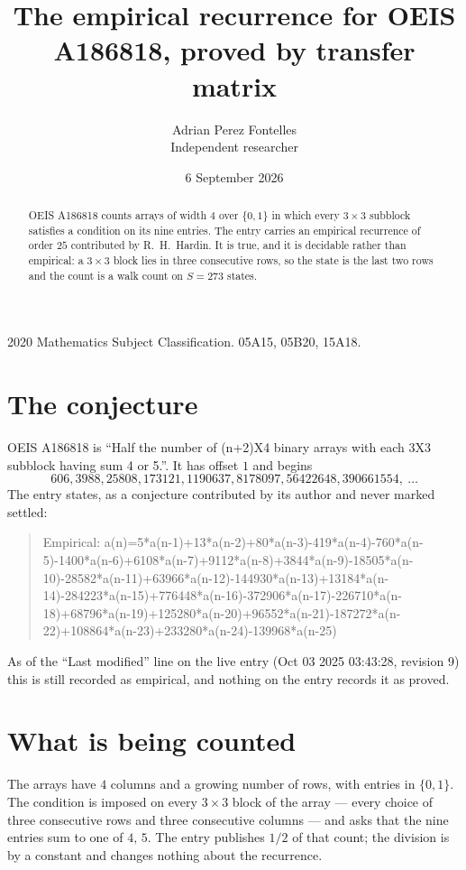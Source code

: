 \documentclass[11pt,a4paper]{article}
\title{The empirical recurrence for OEIS A186818, proved by transfer matrix}
\author{Adrian Perez Fontelles\\ \small Independent researcher}
\date{6 September 2026}
\theoremstyle{plain}
\theoremstyle{definition}
\begin{document}
\maketitle

\begin{abstract}
OEIS A186818 counts arrays of width $4$ over $\{0,1\}$ in which every $3\times3$ subblock
satisfies a condition on its nine entries. The entry carries an empirical recurrence of order
$25$ contributed by R.~H.~Hardin. It is true, and it is decidable rather than empirical: a
$3\times3$ block lies in three consecutive rows, so the state is the last two rows and the
count is a walk count on $S=273$ states.
\end{abstract}

\noindent\small 2020 Mathematics Subject Classification. 05A15, 05B20, 15A18.\normalsize

\section{The conjecture}

OEIS A186818 is ``Half the number of (n+2)X4 binary arrays with each 3X3 subblock having sum 4 or 5.''. It has offset $1$ and begins
\[
606, 3988, 25808, 173121, 1190637, 8178097, 56422648, 390661554,\ \dots
\]
The entry states, as a conjecture contributed by its author and never marked settled:
\begin{quote}
Empirical: a(n)=5*a(n-1)+13*a(n-2)+80*a(n-3)-419*a(n-4)-760*a(n-5)-1400*a(n-6)+6108*a(n-7)+9112*a(n-8)+3844*a(n-9)-18505*a(n-10)-28582*a(n-11)+63966*a(n-12)-144930*a(n-13)+13184*a(n-14)-284223*a(n-15)+776448*a(n-16)-372906*a(n-17)-226710*a(n-18)+68796*a(n-19)+125280*a(n-20)+96552*a(n-21)-187272*a(n-22)+108864*a(n-23)+233280*a(n-24)-139968*a(n-25)
\end{quote}
As of the ``Last modified'' line on the live entry (Oct 03 2025 03:43:28, revision 9) this is still
recorded as empirical, and nothing on the entry records it as proved.

\section{What is being counted}

The arrays have $4$ columns and a growing number of rows, with entries in $\{0,1\}$. The
condition is imposed on every $3\times3$ block of the array --- every choice of three
consecutive rows and three consecutive columns --- and asks that the nine entries sum to one of $4,\,5$. The entry publishes $1/2$ of that count; the division is by a constant and changes nothing about the recurrence.
\end{document}
